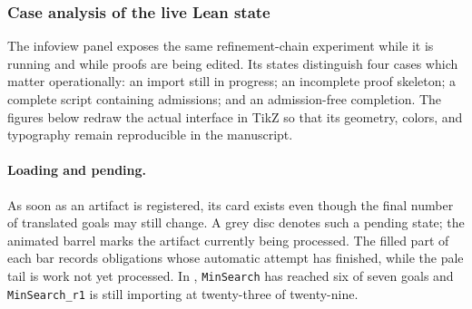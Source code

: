 \subsubsection{Case analysis of the live Lean state}
\label{subsec:barrel-live-state-cases}

The infoview panel exposes the same refinement-chain experiment while it is
running and while proofs are being edited.  Its states distinguish four cases
which matter operationally: an import still in progress; an incomplete proof
skeleton; a complete script containing admissions; and an admission-free
completion.  The figures below redraw the actual interface in TikZ so that its
geometry, colors, and typography remain reproducible in the manuscript.


\paragraph*{Loading and pending.}
As soon as an artifact is registered, its card exists even though the final
number of translated goals may still change.  A grey disc denotes such a
pending state; the animated barrel marks the artifact currently being
processed.  The filled part of each bar records obligations whose automatic
attempt has finished, while the pale tail is work not yet processed.  In
, \texttt{MinSearch} has reached six of seven
goals and \texttt{MinSearch\_r1} is still importing at twenty-three of
twenty-nine.


